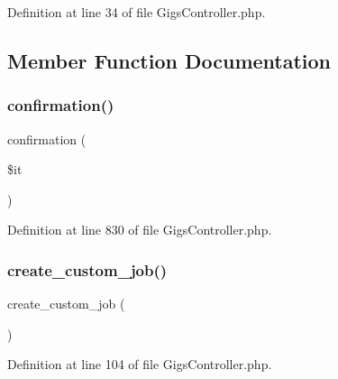 Definition at line 34 of file Gigs\+Controller.\+php.



\subsection{Member Function Documentation}
\mbox{\label{class_responsive_1_1_http_1_1_controllers_1_1_gigs_controller_a75c4acb831d0624f784c3c0e49e0ad32}} 
\subsubsection{\texorpdfstring{confirmation()}{confirmation()}}
{\footnotesize\ttfamily confirmation (\begin{DoxyParamCaption}\item[{}]{\$it }\end{DoxyParamCaption})}



Definition at line 830 of file Gigs\+Controller.\+php.

\mbox{\label{class_responsive_1_1_http_1_1_controllers_1_1_gigs_controller_a12c76d840ce9ab821c229e8acddfa697}} 
\subsubsection{\texorpdfstring{create\_custom\_job()}{create\_custom\_job()}}
{\footnotesize\ttfamily create\+\_\+custom\+\_\+job (\begin{DoxyParamCaption}{ }\end{DoxyParamCaption})}



Definition at line 104 of file Gigs\+Controller.\+php.

\mbox{\label{class_responsive_1_1_http_1_1_controllers_1_1_gigs_controller_adc63b288acdb243fe38a3b6418dcce09}} 
